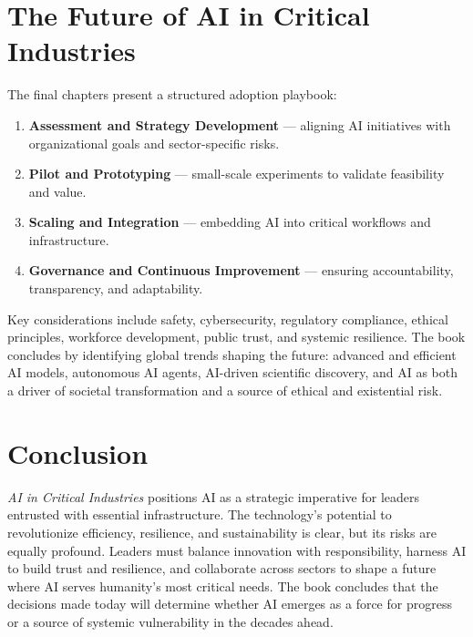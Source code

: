 \section*{The Future of AI in Critical Industries}
The final chapters present a structured adoption playbook: 
\begin{enumerate}
    \item \textbf{Assessment and Strategy Development} --- aligning AI initiatives with organizational goals and sector-specific risks. 
    \item \textbf{Pilot and Prototyping} --- small-scale experiments to validate feasibility and value. 
    \item \textbf{Scaling and Integration} --- embedding AI into critical workflows and infrastructure. 
    \item \textbf{Governance and Continuous Improvement} --- ensuring accountability, transparency, and adaptability. 
\end{enumerate}

Key considerations include safety, cybersecurity, regulatory compliance, ethical principles, workforce development, 
public trust, and systemic resilience. The book concludes by identifying global trends shaping the future: 
advanced and efficient AI models, autonomous AI agents, AI-driven scientific discovery, and AI as both a driver 
of societal transformation and a source of ethical and existential risk. 

\section*{Conclusion}
\emph{AI in Critical Industries} positions AI as a strategic imperative for leaders entrusted with essential infrastructure. 
The technology’s potential to revolutionize efficiency, resilience, and sustainability is clear, but its risks are equally profound. 
Leaders must balance innovation with responsibility, harness AI to build trust and resilience, and collaborate across sectors to shape 
a future where AI serves humanity’s most critical needs. The book concludes that the decisions made today will determine whether AI 
emerges as a force for progress or a source of systemic vulnerability in the decades ahead.
